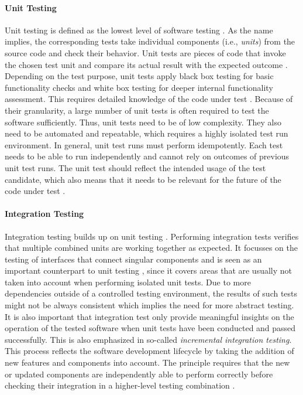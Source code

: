 \paragraph{Unit Testing} Unit testing is defined as the lowest level of software testing \cite[65]{Mahfuz2016}. As the name implies, the corresponding tests take individual components (i.e., \textit{units}) from the source code and check their behavior. Unit tests are pieces of code that invoke the chosen test unit and compare its actual result with the expected outcome \cite[sec. 1]{Osherove2013}. Depending on the test purpose, unit tests apply black box testing for basic functionality checks and white box testing for deeper internal functionality assessment. This requires detailed knowledge of the code under test \cite{Mahfuz2016}. Because of their granularity, a large number of unit tests is often required to test the software sufficiently. Thus, unit tests need to be of low complexity. They also need to be automated and repeatable, which requires a highly isolated test run environment. In general, unit test runs must perform idempotently. Each test needs to be able to run independently and cannot rely on outcomes of previous unit test runs. The unit test should reflect the intended usage of the test candidate, which also means that it needs to be relevant for the future of the code under test \cite[sec. 2]{Osherove2013}.

\paragraph{Integration Testing} Integration testing builds up on unit testing \cite[66]{Mahfuz2016}. Performing integration tests verifies that multiple combined units are working together as expected. It focusses on the testing of interfaces that connect singular components \cite[66]{Mahfuz2016} and is seen as an important counterpart to unit testing \cite[sec. 3]{Osherove2013}, since it covers areas that are usually not taken into account when performing isolated unit tests. Due to more dependencies outside of a controlled testing environment, the results of such tests might not be always consistent \cite[sec. 3]{Osherove2013} which implies the need for more abstract testing. It is also important that integration test only provide meaningful insights on the operation of the tested software when unit tests have been conducted and passed successfully. This is also emphasized in so-called \textit{incremental integration testing}. This process reflects the software development lifecycle by taking the addition of new features and components into account. The principle requires that the new or updated components are independently able to perform correctly before checking their integration in a higher-level testing combination \cite[66]{Mahfuz2016}.

